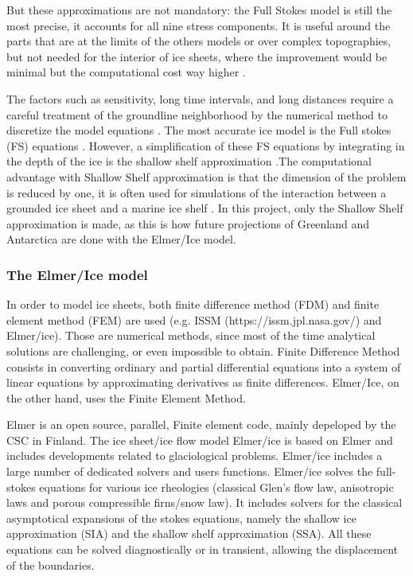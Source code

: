 \documentclass[a4paper,12pt]{article}
\begin{document}
But these approximations are not mandatory: the Full Stokes model is still the most precise, it accounts for all nine stress components. It is useful around the parts that are at the limits of the others models or over complex topographies, but not needed for the interior of ice sheets, where the improvement would be minimal but the computational cost way higher \cite[]{larour2012continental}.

The factors such as sensitivity, long time intervals, and long distances require a careful treatment of the groundline neighborhood by the numerical method to discretize the model equations \cite[]{cheng2019full}. The most accurate ice model is the Full stokes (FS) equations \cite{cheng2019full}. However, a simplification of these FS equations by integrating in the depth of the ice is the shallow shelf approximation \cite[]{macayeal1989large}.The computational advantage with Shallow Shelf approximation is that the dimension of the problem is reduced by one, it is often used for simulations of the interaction between a grounded ice sheet and a marine ice shelf \cite[]{cheng2019full}. 
In this project, only the Shallow Shelf approximation is made, as this is how future projections of Greenland and Antarctica are done with the Elmer/Ice model.
\subsubsection{The Elmer/Ice model}
In order to model ice sheets, both finite difference method (FDM) and finite element method (FEM) are used (e.g. ISSM (https://issm.jpl.nasa.gov/) and Elmer/ice). Those are numerical methods, since most of the time analytical solutions are challenging, or even impossible to obtain. Finite Difference Method consists in converting ordinary and partial differential equations into a system of linear equations by approximating derivatives as finite differences. Elmer/Ice, on the other hand, uses the Finite Element Method.

Elmer is an open source, parallel, Finite element code, mainly depeloped by the CSC in Finland. The ice sheet/ice flow model Elmer/ice is based on Elmer and includes developments related to glaciological problems. Elmer/ice includes a large number of dedicated solvers and users functions.
Elmer/ice solves the full-stokes equations for various ice rheologies (classical  Glen's flow law, anisotropic laws and porous compressible firns/snow law). It includes solvers for the classical asymptotical expansions of the stokes equations, namely the shallow 	ice approximation (SIA) and the shallow shelf approximation (SSA). All these equations can be solved diagnostically or in transient, allowing the displacement of the boundaries. 
\end{document}
